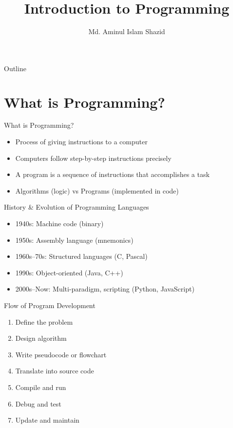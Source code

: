 \documentclass[12pt, aspectratio=169]{beamer}
\title{Introduction to Programming}
\author{Md. Aminul Islam Shazid}
\date{}
\begin{document}
    {
		\addtocounter{framenumber}{-2}    %

		\begin{frame}
			\titlepage
		\end{frame}

		\begin{frame}{Outline}
			\tableofcontents[subsectionstyle=hide]
		\end{frame}
	}


    \section{What is Programming?}

    \begin{frame}{What is Programming?}
        \begin{itemize}
            \item Process of giving instructions to a computer
            \item Computers follow step-by-step instructions precisely
            \item A program is a sequence of instructions that accomplishes a task
            \item Algorithms (logic) vs Programs (implemented in code)
        \end{itemize}
    \end{frame}


    \begin{frame}{History \& Evolution of Programming Languages}
        \begin{itemize}
            \item 1940s: Machine code (binary)
            \item 1950s: Assembly language (mnemonics)
            \item 1960s--70s: Structured languages (C, Pascal)
            \item 1990s: Object-oriented (Java, C++)
            \item 2000s--Now: Multi-paradigm, scripting (Python, JavaScript)
        \end{itemize}
    \end{frame}


    \begin{frame}{Flow of Program Development}
        \begin{enumerate}
            \item Define the problem
            \item Design algorithm
            \item Write pseudocode or flowchart
            \item Translate into source code
            \item Compile and run
            \item Debug and test
            \item Update and maintain
        \end{enumerate}
    \end{frame}
\end{document}
